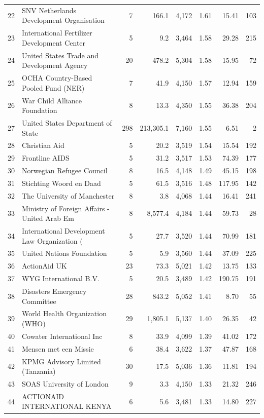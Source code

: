 \begin{tabular}{rlrrrrrr}
22 & SNV Netherlands Development Organisation & 7 & 166.1 & 4,172 & 1.61 & 15.41 & 103\\
23 & International Fertilizer Development Center & 5 & 9.2 & 3,464 & 1.58 & 29.28 & 215\\
24 & United States Trade and Development Agency & 20 & 478.2 & 5,304 & 1.58 & 15.95 & 72\\
25 & OCHA Country-Based Pooled Fund (NER) & 7 & 41.9 & 4,150 & 1.57 & 12.94 & 159\\
26 & War Child Alliance Foundation & 8 & 13.3 & 4,350 & 1.55 & 36.38 & 204\\
27 & United States Department of State & 298 & 213,305.1 & 7,160 & 1.55 & 6.51 & 2\\
28 & Christian Aid & 5 & 20.2 & 3,519 & 1.54 & 15.54 & 192\\
29 & Frontline AIDS & 5 & 31.2 & 3,517 & 1.53 & 74.39 & 177\\
30 & Norwegian Refugee Council & 8 & 16.5 & 4,148 & 1.49 & 45.15 & 198\\
31 & Stichting Woord en Daad & 5 & 61.5 & 3,516 & 1.48 & 117.95 & 142\\
32 & The University of Manchester & 8 & 3.8 & 4,068 & 1.44 & 16.41 & 241\\
33 & Ministry of Foreign Affairs - United Arab Em & 8 & 8,577.4 & 4,184 & 1.44 & 59.73 & 28\\
34 & International Development Law Organization ( & 5 & 27.7 & 3,520 & 1.44 & 70.99 & 181\\
35 & United Nations Foundation & 5 & 5.9 & 3,560 & 1.44 & 37.09 & 225\\
36 & ActionAid UK & 23 & 73.3 & 5,021 & 1.42 & 13.75 & 133\\
37 & WYG International B.V. & 5 & 20.5 & 3,489 & 1.42 & 190.75 & 191\\
38 & Disasters Emergency Committee & 28 & 843.2 & 5,052 & 1.41 & 8.70 & 55\\
39 & World Health Organization (WHO) & 29 & 1,805.1 & 5,137 & 1.40 & 26.35 & 42\\
40 & Cowater International Inc & 8 & 33.9 & 4,099 & 1.39 & 41.02 & 172\\
41 & Mensen met een Missie & 6 & 38.4 & 3,622 & 1.37 & 47.87 & 168\\
42 & KPMG Advisory Limited (Tanzania) & 30 & 17.5 & 5,036 & 1.36 & 11.81 & 194\\
43 & SOAS University of London & 9 & 3.3 & 4,150 & 1.33 & 21.32 & 246\\
44 & ACTIONAID INTERNATIONAL KENYA & 6 & 5.6 & 3,481 & 1.33 & 14.80 & 227\\

\end{tabular}
